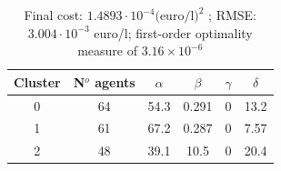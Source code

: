 \documentclass[graybox]{svmult}
\begin{document}
\begin{table}[!ht]
\centering
\renewcommand{\arraystretch}{1.3}

\begin{tabular}{cccccc}
\toprule
Cluster & N$^o$ agents & $\alpha$ & $\beta$ & $\gamma$ & $\delta$\\
\midrule
0 & 64 & 54.3 & 0.291 & 0 & 13.2\\
1 & 61 & 67.2 & 0.287 & 0 & 7.57\\
2 & 48 & 39.1 & 10.5 & 0  & 20.4\\
\bottomrule
\end{tabular}

\caption{Final cost: $1.4893\cdot 10^{-4} \text{(euro/l)}^2$ ; RMSE: $3.004\cdot 10^{-3}$ euro/l; first-order optimality measure of $3.16 \times 10^{-6}$}
\label{tab:parameters}

\end{table}





\end{document}
